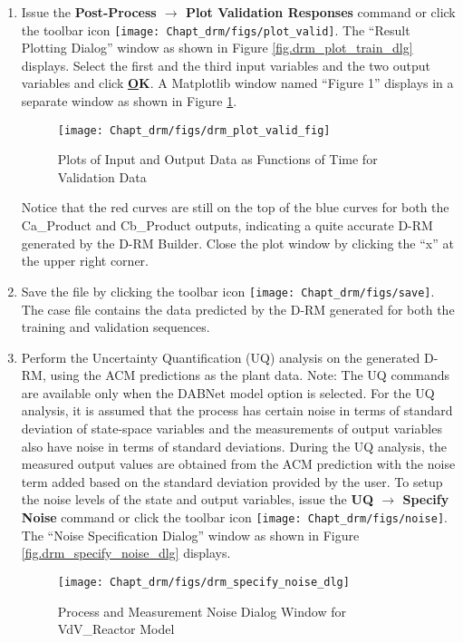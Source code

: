 \begin{enumerate}
	\item Issue the \textbf{Post-Process $\rightarrow$ Plot Validation Responses} command or click the toolbar icon \texttt{[image: Chapt\_drm/figs/plot\_valid]}.  The ``Result Plotting Dialog'' window as shown in Figure \ref{fig.drm_plot_train_dlg} displays.  Select the first and the third input variables and the two output variables and click \textbf{\underline{O}K}.  A Matplotlib window named ``Figure 1'' displays in a separate window as shown in Figure \ref{fig.drm_plot_valid_fig}.
	\begin{figure}[H]
		\begin{center}
			\texttt{[image: Chapt\_drm/figs/drm\_plot\_valid\_fig]}
			\caption{Plots of Input and Output Data as Functions of Time for Validation Data}
			\label{fig.drm_plot_valid_fig}
		\end{center}
	\end{figure}
	Notice that the red curves are still on the top of the blue curves for both the Ca\_Product and Cb\_Product outputs, indicating a quite accurate D-RM generated by the D-RM Builder.  Close the plot window by clicking the ``x'' at the upper right corner.
	\item Save the file by clicking the toolbar icon \texttt{[image: Chapt\_drm/figs/save]}.  The case file contains the data predicted by the D-RM generated for both the training and validation sequences.
	\item Perform the Uncertainty Quantification (UQ) analysis on the generated D-RM, using the ACM predictions as the plant data.  Note: The UQ commands are available only when the DABNet model option is selected.  For the UQ analysis, it is assumed that the process has certain noise in terms of standard deviation of state-space variables and the measurements of output variables also have noise in terms of standard deviations.  During the UQ analysis, the measured output values are obtained from the ACM prediction with the noise term added based on the standard deviation provided by the user.  To setup the noise levels of the state and output variables, issue the \textbf{UQ $\rightarrow$ Specify Noise} command or click the toolbar icon \texttt{[image: Chapt\_drm/figs/noise]}.  The ``Noise Specification Dialog'' window as shown in Figure \ref{fig.drm_specify_noise_dlg} displays.
	\begin{figure}[H]
		\begin{center}
			\texttt{[image: Chapt\_drm/figs/drm\_specify\_noise\_dlg]}
			\caption{Process and Measurement Noise Dialog Window for VdV\_Reactor Model}

\end{center}
\end{figure}
\end{enumerate}
